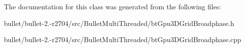 The documentation for this class was generated from the following files\+:\begin{DoxyCompactItemize}
\item 
bullet/bullet-\/2.-\/r2704/src/\+Bullet\+Multi\+Threaded/bt\+Gpu3\+D\+Grid\+Broadphase.\+h\item 
bullet/bullet-\/2.-\/r2704/src/\+Bullet\+Multi\+Threaded/bt\+Gpu3\+D\+Grid\+Broadphase.\+cpp\end{DoxyCompactItemize}
